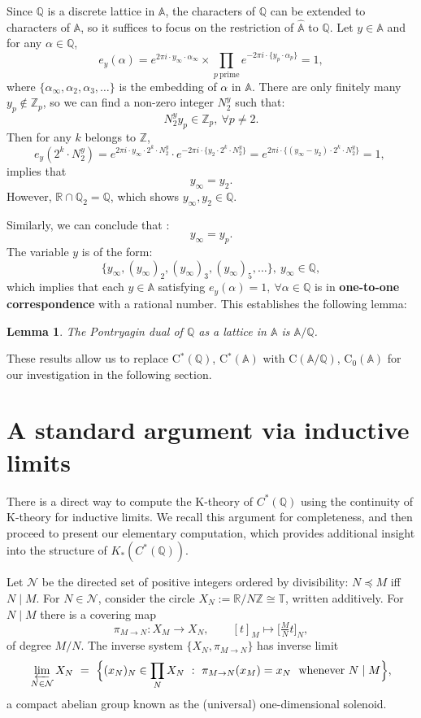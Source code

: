 \documentclass[11pt]{article}
\newtheorem{lemma}[theorem]{Lemma}     %
\newcommand{\Z}{\mathbb{Z}}
\newcommand{\Q}{\mathbb{Q}}
\newcommand{\R}{\mathbb{R}}
\newcommand{\T}{\mathbb{T}}
\newcommand{\A}{\mathbb{A}}
\theoremstyle{remark}
\begin{document}
Since \( \mathbb{Q} \) is a discrete lattice in \( \mathbb{A} \), the characters of \(\mathbb{Q} \) can be extended to characters of \(\mathbb{A}\), so it suffices to focus on the restriction of  \(\hat{\mathbb{A}}\) to $\mathbb{Q}$.
Let $y\in \mathbb{A}$ and for any \(\alpha\in \mathbb{Q}\),
\[
e_{y}(\alpha)=e^{2\pi i\cdot y_\infty\cdot \alpha_\infty}\times\prod\limits_{p\ \text{prime}}e^{-2\pi i\cdot \{y_p\cdot \alpha_p\}}=1,
\]
where \(\{\alpha_\infty,\alpha_2,\alpha_3,\dots\}\) is the embedding of \(\alpha\) in \(\A\).
There are only finitely many $y_p\notin \mathbb{Z}_p$, so we can find a non-zero integer $N_2^y$ such that:
\[
N^y_2y_p\in \mathbb{Z}_p,\ \forall p\neq2.
\]
Then for any $k$ belongs to \(\mathbb{Z}\), 
\[
e_y(2^k\cdot N_2^y)=e^{2\pi i\cdot y_\infty\cdot 2^k\cdot N_2^y}\cdot e^{-2\pi i\cdot \{y_2\cdot 2^k\cdot N_2^y\}}=e^{2\pi i\cdot \{(y_\infty-y_2)\cdot 2^k\cdot N_2^y\}}=1, \
\]
implies that
\[
y_\infty=y_2.
\]
However, $\mathbb{R}\cap\mathbb{Q}_2=\mathbb{Q}$, which shows \(y_\infty,y_2\in \mathbb{Q}.\)

Similarly, we can conclude that :
\[
y_\infty=y_p.
\]
The variable \( y \) is of the form:
\[
\{y_\infty,(y_\infty)_2,(y_\infty)_3,(y_\infty)_5,\dots\},\ y_\infty\in \mathbb{Q},
\]
which implies that each \( y\in \A \) satisfying \( e_y(\alpha) = 1,\ \forall\alpha\in\mathbb{Q} \) is in \textbf{one-to-one correspondence} with a rational number. This establishes the following lemma:
\begin{lemma}
    The Pontryagin dual of  \(\mathbb{Q}\) as a lattice in $\A$ is $\A/\mathbb{Q}$.
\end{lemma}
These results allow us to replace C$^*(\mathbb{Q})$, C$^*(\mathbb{A})$ with C$(\A/\mathbb{Q})$, C$_0(\A)$ for our investigation in the following section.

\section{A standard argument via inductive limits}\label{sec3}

There is a direct way to compute the K-theory of $C^*(\Q)$ using the continuity of K-theory for inductive limits. We recall this argument for completeness, and then proceed to present our elementary computation, which provides additional insight into the structure of $K_*(C^*(\Q))$.

Let $\mathcal{N}$ be the directed set of positive integers ordered by divisibility: $N\preceq M$ iff $N\mid M$. For $N\in\mathcal{N}$, consider the circle $X_{N}:=\R/N\Z\cong \T$, written additively. For $N\mid M$ there is a covering map
\begin{equation}\label{eq:cover}
\pi_{M\to N}: X_{M}\longrightarrow X_{N},\qquad [t]_{M}\longmapsto \Big[\tfrac{M}{N}t\Big]_{N},
\end{equation}
of degree $M/N$. The inverse system $\{X_{N},\pi_{M\to N}\}$ has inverse limit
\begin{equation}\label{eq:solenoid}
\varprojlim_{N\in\mathcal{N}} X_{N}\ =\ \Big\{(x_{N})_{N}\in \prod_{N} X_{N}\ :\ \pi_{M\to N}(x_{M})=x_{N}\ \text{ whenever } N\mid M\Big\},
\end{equation}
a compact abelian group known as the (universal) one-dimensional solenoid.
\end{document}
